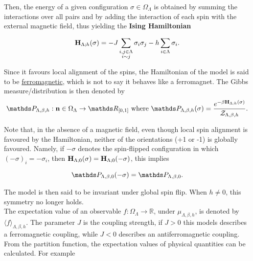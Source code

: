 \documentclass{homework}
\begin{document}
Then, the energy of a given configuration $\sigma \in \Omega_{\Lambda}$ is obtained by summing the interactions over all pairs and by adding the interaction of each spin with the external magnetic field, thus yielding the \textbf{Ising Hamiltonian}

\begin{equation}
    {\bf H}_{\Lambda; h}(\sigma) = - J \sum_{\substack{i,j \in \Lambda \\
    i \sim j}} \sigma_i \sigma_j - h \sum_{i \in \Lambda} \sigma_i.
\end{equation}

Since it favours local alignment of the spins, the Hamiltonian of the model is said to be \underline{ferromagnetic}, which is not to say it behaves like a ferromagnet. The Gibbs measure/distribution is then denoted by 
\begin{equation}
    \begin{split}
        \prob_{\Lambda, \beta, h} :{\bf n} \in \Omega_{\Lambda}\rightarrow \R_{[0,1]} \textnormal{ where }
         \prob_{\Lambda, \beta, h}(\sigma) = \frac{e^{-\beta {\bf H}_{\Lambda; h}(\sigma) }}{\mathcal{Z}_{\Lambda, \beta, h}}. 
    \end{split}
\end{equation}

Note that, in the absence of a magnetic field, even though local spin alignment is favoured by the Hamiltonian, neither of the orientations (+1 or -1) is globally favoured. Namely, if $-\sigma$ denotes the spin-flipped configuration in which $(-\sigma)_{i} = -\sigma_i$, then ${\bf H}_{\Lambda; 0}(\sigma) = {\bf H}_{\Lambda; 0}(-\sigma)$, this implies 

$$
    \prob_{\Lambda, \beta, 0} (-\sigma) = \prob_{\Lambda, \beta, 0}. 
$$

The model is then said to be invariant under global spin flip. When $h\neq0$, this symmetry no longer holds. \\

The expectation value of an observable $f : \Omega_\Lambda \rightarrow \mathds{R}$, under $\mu_{\Lambda, \beta, h}$, is denoted by $\langle f \rangle_{\Lambda, \beta, h}$. 
The parameter $J$ is the coupling strength, if $J>0$ this models describes a ferromagnetic coupling, while $J<0$ describes an antiferromagnetic coupling. 
From the partition function, the expectation values of physical quantities can be calculated. For example
\end{document}

